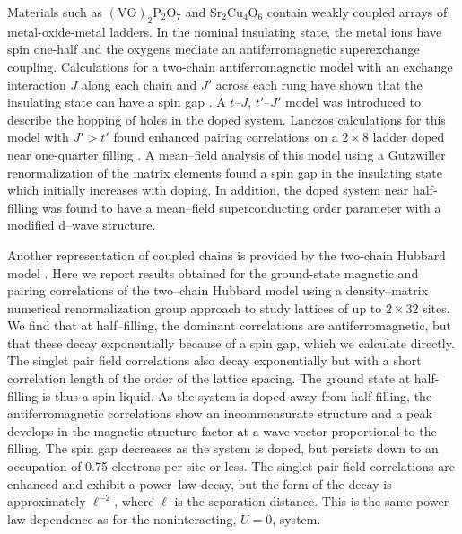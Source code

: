 
\narrowtext

Materials such as $(\text{VO})_2 \text{P}_2 \text{O}_7$ \cite{johnston} and
$\text{Sr}_2 \text{Cu}_4 \text{O}_6$ \cite{takano,rice1} contain weakly
coupled arrays of metal-oxide-metal ladders.
In the nominal insulating state, the metal ions have spin one-half and
the oxygens mediate an antiferromagnetic superexchange coupling.
Calculations for a two-chain antiferromagnetic model with an exchange
interaction $J$ along each chain and $J'$ across each rung have shown
that the insulating state can have a spin gap
\cite{dagotto,strong,barnes,parola}.
A $t$--$J$, $t'$--$J'$ model was introduced to describe the hopping of
holes in the doped system.
Lanczos calculations for this model with
$J' > t'$ found enhanced pairing
correlations on a $2\times 8$ ladder doped near one-quarter
filling \cite{dagotto}.
A mean--field analysis of this model using a Gutzwiller
renormalization of the matrix elements \cite{rice2} found a spin gap
in the insulating state which initially increases with doping.
In addition, the doped system near half-filling was found to have a
mean--field superconducting order parameter with a modified d--wave
structure.

Another representation of coupled chains is provided by the two-chain
Hubbard model \cite{noack}.
Here we report results obtained for the ground-state magnetic and pairing
correlations of the two--chain Hubbard model using a
density--matrix numerical renormalization group approach \cite{white}
to study lattices of up to $2\times 32$ sites.
We find that at half--filling, the dominant correlations are
antiferromagnetic, but that these decay exponentially because of a
spin gap, which we calculate directly.
The singlet pair field correlations also decay exponentially but with
a short correlation length of the order of the lattice spacing.
The ground state at half-filling is thus a spin liquid.
As the system is doped away from half-filling,
the antiferromagnetic correlations show an incommensurate structure
and a peak develops in the magnetic structure factor
at a wave vector proportional to the filling.
The spin gap decreases as the system is doped, but persists down to an
occupation of 0.75 electrons per site or less.
The singlet pair field correlations are enhanced
and exhibit a power--law decay, but the form of the decay is approximately
$\ell^{-2}$, where $\ell$ is the separation distance.
This is the
same power-law dependence as for the noninteracting, $U=0$, system.


